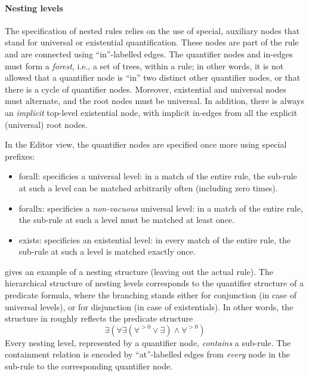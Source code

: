 \paragraph{Nesting levels}

The specification of nested rules relies on the use of special, auxiliary nodes
that stand for universal or existential quantification. These nodes are part of
the rule and are connected using ``\textsf{in}''-labelled edges. The quantifier
nodes and \textsf{in}-edges must form a \emph{forest}, i.e., a set of trees,
within a rule; in other words, it is not allowed that a quantifier node is
``\textsf{in}'' two distinct other quantifier nodes, or that there is a cycle
of quantifier nodes. Moreover, existential and universal nodes must alternate,
and the root nodes must be universal. In addition, there is always an
\emph{implicit} top-level existential node, with implicit \textsf{in}-edges
from all the explicit (universal) root nodes.

In the Editor view, the quantifier nodes are specified once more using special
prefixes:
\begin{itemize}\noitemsep
\item \textsf{forall:} specificies a universal level: in a match of the entire
  rule, the sub-rule at such a level can be matched arbitrarily often
  (including zero times).
\item \textsf{forallx:} specificies a \emph{non-vacuous} universal level: in a
  match of the entire rule, the sub-rule at such a level must be matched at
  least once.
\item \textsf{exists:} specificies an existential level: in every match of the
  entire rule, the sub-rule at such a level is matched exactly once.
\end{itemize}


 gives an example of a nesting structure (leaving out the actual
rule). The hierarchical structure of nesting levels corresponds to the
quantifier structure of a predicate formula, where the branching stands either
for conjunction (in case of universal levels), or for disjunction (in case of
existentials). In other words, the structure in  roughly reflects
the predicate structure
%
\[ \exists (\forall \exists (\forall^{>0} \vee \exists) \wedge \forall^{>0}) \]
%
Every nesting level, represented by a quantifier node, \emph{contains} a
sub-rule. The containment relation is encoded by ``\textsf{at}''-labelled edges
from \emph{every} node in the sub-rule to the corresponding quantifier node.

